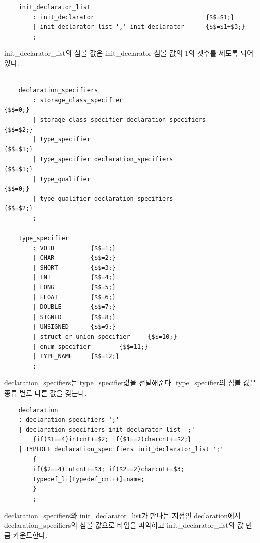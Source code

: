 \documentclass{oblivoir}
\begin{document}
\begin{verbatim}
    init_declarator_list
        : init_declarator                               {$$=$1;}
        | init_declarator_list ',' init_declarator      {$$=$1+$3;}
        ;
\end{verbatim}
init\_declarator\_list의 심볼 값은
init\_declarator 심볼 값의 1의 갯수를 세도록 되어있다.

\begin{verbatim}

    declaration_specifiers
        : storage_class_specifier                               {$$=0;}
        | storage_class_specifier declaration_specifiers        {$$=$2;}
        | type_specifier                                        {$$=$1;}
        | type_specifier declaration_specifiers                 {$$=$1;}
        | type_qualifier                                        {$$=0;}
        | type_qualifier declaration_specifiers                 {$$=$2;}
        ;
        
    type_specifier
        : VOID          {$$=1;}
        | CHAR          {$$=2;}
        | SHORT         {$$=3;}
        | INT           {$$=4;}
        | LONG          {$$=5;}
        | FLOAT         {$$=6;}
        | DOUBLE        {$$=7;}
        | SIGNED        {$$=8;}
        | UNSIGNED      {$$=9;}
        | struct_or_union_specifier     {$$=10;}
        | enum_specifier        {$$=11;}
        | TYPE_NAME     {$$=12;}
        ;
\end{verbatim}

declaration\_specifiers는 type\_specifier값을 전달해준다.
type\_specifier의 심볼 값은 종류 별로 다른 값을 갖는다.

\begin{verbatim}
    declaration                                                                                      
    : declaration_specifiers ';'                                             
    | declaration_specifiers init_declarator_list ';' 
        {if($1==4)intcnt+=$2; if($1==2)charcnt+=$2;}
    | TYPEDEF declaration_specifiers init_declarator_list ';'
        {
        if($2==4)intcnt+=$3; if($2==2)charcnt+=$3;
        typedef_li[typedef_cnt++]=name;
        }
        ;
\end{verbatim}

declaration\_specifiers와 init\_declarator\_list가 만나는 지점인 declaration에서 declaration\_specifiers의 심볼 값으로 타입을 파악하고 init\_declarator\_list의 값 만큼 카운트한다.
\end{document}
